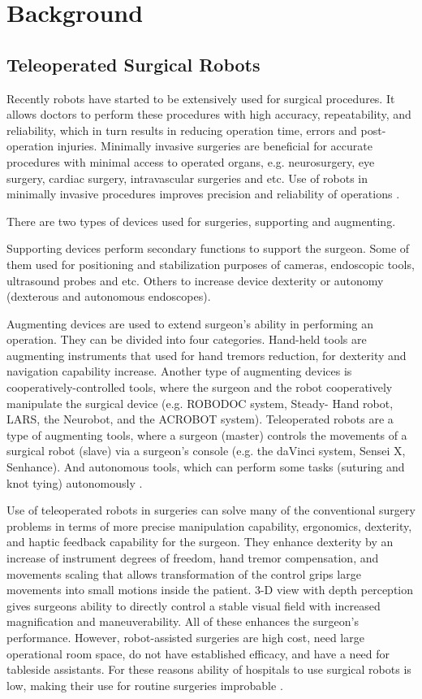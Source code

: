 \chapter{Background}
\label{back}

\section{Teleoperated Surgical Robots}
\label{sec:daVinci}
Recently robots have started to be extensively used for surgical procedures. It allows doctors to perform these procedures with high accuracy, repeatability, and reliability, which in turn results in reducing operation time, errors and post-operation injuries. Minimally invasive surgeries are beneficial for accurate procedures with minimal access to operated organs, e.g. neurosurgery, eye surgery, cardiac surgery, intravascular surgeries and etc.  Use of robots in minimally invasive procedures improves precision and reliability of operations \cite{tavakoli_haptics_2008}.

There are two types of devices used for surgeries, supporting and augmenting. 

Supporting devices perform secondary functions to support the surgeon.  Some of them used for positioning and stabilization purposes of cameras, endoscopic tools, ultrasound probes and etc. Others to increase device dexterity or autonomy (dexterous and autonomous endoscopes).

Augmenting devices are used to extend surgeon's ability in performing an operation. They can be divided into four categories. Hand-held tools are augmenting instruments that used for hand tremors reduction, for dexterity and navigation capability increase. Another type of augmenting devices is cooperatively-controlled tools, where the surgeon and the robot cooperatively manipulate the surgical device (e.g. ROBODOC system, Steady- Hand robot, LARS, the Neurobot, and the ACROBOT system). Teleoperated robots are a type of augmenting tools, where a surgeon (master) controls the movements of a surgical robot (slave) via a surgeon's console (e.g. the daVinci system, Sensei X, Senhance). And autonomous tools, which can perform some tasks (suturing and knot tying) autonomously \cite{tavakoli_haptics_2008}.

Use of teleoperated robots in surgeries can solve many of the conventional surgery problems in terms of more precise manipulation capability, ergonomics, dexterity, and haptic feedback capability for the surgeon. They enhance dexterity by an increase of instrument degrees of freedom, hand tremor compensation, and movements scaling that allows transformation of the control grips large movements into small motions inside the patient. 3-D view with depth perception gives surgeons ability to directly control a stable visual field with increased magnification and maneuverability. All of these enhances the surgeon's performance. However, robot-assisted surgeries are high cost, need large operational room space, do not have established efficacy, and have a need for tableside assistants. For these reasons ability of hospitals to use surgical robots is low, making their use for routine surgeries improbable \cite{tavakoli_haptics_2008}.

